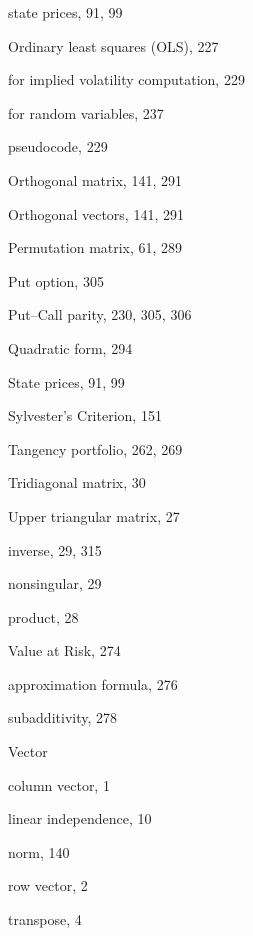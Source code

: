 {\noindent\hspace*{1.4em}state prices, 91, 99

\noindent Ordinary least squares (OLS), 227

\noindent\hspace*{1.4em}for implied volatility computation, 229

\noindent\hspace*{1.4em}for random variables, 237

\noindent\hspace*{1.4em}pseudocode, 229

\noindent Orthogonal matrix, 141, 291

\noindent Orthogonal vectors, 141, 291

\medskip
\noindent Permutation matrix, 61, 289

\noindent Put option, 305

\noindent Put--Call parity, 230, 305, 306

\medskip
\noindent Quadratic form, 294

\medskip
\noindent State prices, 91, 99

\noindent Sylvester's Criterion, 151

\medskip
\noindent Tangency portfolio, 262, 269

\noindent Tridiagonal matrix, 30

\medskip
\noindent Upper triangular matrix, 27

\noindent\hspace*{1.4em}inverse, 29, 315

\noindent\hspace*{1.4em}nonsingular, 29

\noindent\hspace*{1.4em}product, 28

\medskip
\noindent Value at Risk, 274

\noindent\hspace*{1.4em}approximation formula, 276

\noindent\hspace*{1.4em}subadditivity, 278

\noindent Vector

\noindent\hspace*{1.4em}column vector, 1

\noindent\hspace*{1.4em}linear independence, 10

\noindent\hspace*{1.4em}norm, 140

\noindent\hspace*{1.4em}row vector, 2

\noindent\hspace*{1.4em}transpose, 4

\onecolumn
}
